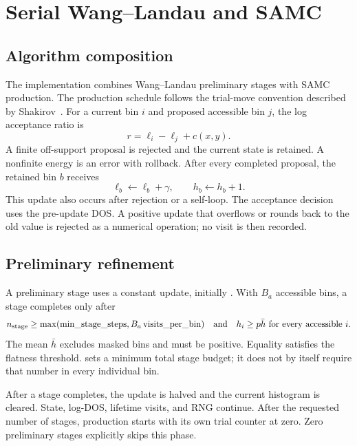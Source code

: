 \documentclass[11pt,a4paper,oneside]{report}
\newcommand{\api}[1]{\texttt{\detokenize{#1}}}
\begin{document}
\chapter{Serial Wang--Landau and SAMC}\label{ch:wl}
\section{Algorithm composition}
The implementation combines Wang--Landau preliminary stages with SAMC production.
The production schedule follows the trial-move convention described by
Shakirov~\cite{shakirov}. For a current bin $i$ and proposed accessible bin $j$,
the log acceptance ratio is
\begin{equation}
 r=\ell_i-\ell_j+c(x,y).
\end{equation}
A finite off-support proposal is rejected and the current state is retained.
A nonfinite energy is an error with rollback. After every completed proposal,
the retained bin $b$ receives
\begin{equation}
 \ell_b\gets\ell_b+\gamma,\qquad h_b\gets h_b+1.
\end{equation}
This update also occurs after rejection or a self-loop. The acceptance decision
uses the pre-update DOS. A positive update that overflows or rounds back to the
old value is rejected as a numerical operation; no visit is then recorded.

\section{Preliminary refinement}
A preliminary stage uses a constant update, initially \api{initial_ln_f}. With
$B_a$ accessible bins, a stage completes only after
\begin{equation}
 n_{\rm stage}\geq\max(\text{min\_stage\_steps},
                       B_a\,\text{visits\_per\_bin})
 \quad\text{and}\quad
 h_i\geq p\bar h\ \text{for every accessible }i.
\end{equation}
The mean $\bar h$ excludes masked bins and must be positive. Equality satisfies
the flatness threshold. \api{visits_per_bin} sets a minimum total stage budget;
it does not by itself require that number in every individual bin.

After a stage completes, the update is halved and the current histogram is
cleared. State, log-DOS, lifetime visits, and RNG continue. After the requested
number of stages, production starts with its own trial counter at zero.
Zero preliminary stages explicitly skips this phase.
\end{document}
